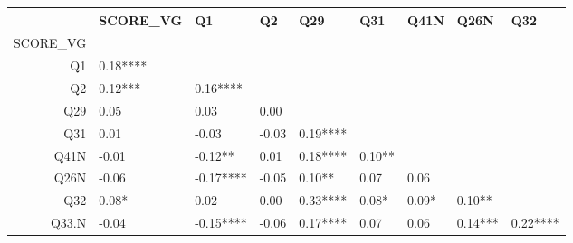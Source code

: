 \begin{table}[ht]
\centering
\begin{tabular}{rllllllll}
  \hline
 & SCORE\_VG & Q1 & Q2 & Q29 & Q31 & Q41N & Q26N & Q32 \\ 
  \hline
SCORE\_VG &  &  &  &  &  &  &  &  \\ 
  Q1 &  0.18**** &  &  &  &  &  &  &  \\ 
  Q2 &  0.12***  &  0.16**** &  &  &  &  &  &  \\ 
  Q29 &  0.05     &  0.03     &  0.00     &  &  &  &  &  \\ 
  Q31 &  0.01     & -0.03     & -0.03     &  0.19**** &  &  &  &  \\ 
  Q41N & -0.01     & -0.12**   &  0.01     &  0.18**** &  0.10**   &  &  &  \\ 
  Q26N & -0.06     & -0.17**** & -0.05     &  0.10**   &  0.07     &  0.06     &  &  \\ 
  Q32 &  0.08*    &  0.02     &  0.00     &  0.33**** &  0.08*    &  0.09*    &  0.10**   &  \\ 
  Q33.N & -0.04     & -0.15**** & -0.06     &  0.17**** &  0.07     &  0.06     &  0.14***  &  0.22**** \\ 
   \hline
\end{tabular}
\end{table}
